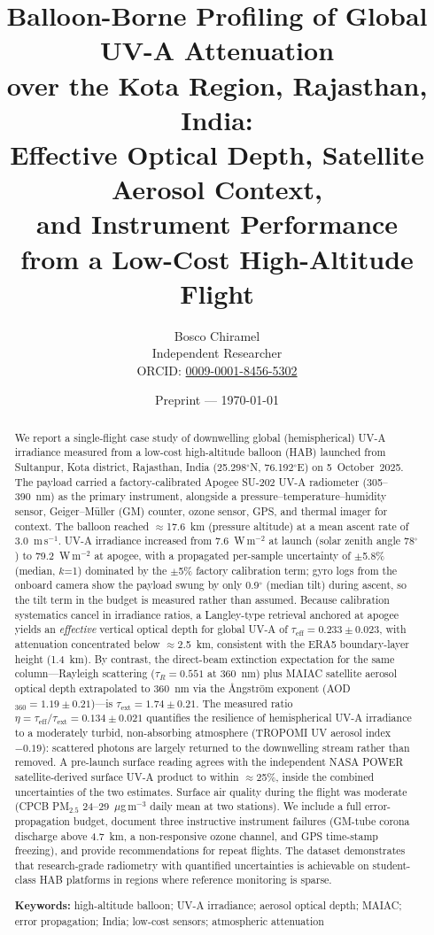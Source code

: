 \documentclass[11pt,a4paper]{article}
\title{\textbf{Balloon-Borne Profiling of Global UV-A Attenuation\\
over the Kota Region, Rajasthan, India:\\
Effective Optical Depth, Satellite Aerosol Context,\\
and Instrument Performance\\
from a Low-Cost High-Altitude Flight}}
\author{Bosco Chiramel\\
\small Independent Researcher\\
\small ORCID: \href{https://orcid.org/0009-0001-8456-5302}{0009-0001-8456-5302}}
\date{Preprint --- \today}
\begin{document}
\maketitle

\begin{abstract}
\noindent
We report a single-flight case study of downwelling global (hemispherical) UV-A irradiance
measured from a low-cost high-altitude balloon (HAB) launched from Sultanpur, Kota
district, Rajasthan, India (25.298$^\circ$N, 76.192$^\circ$E) on 5~October~2025. The payload carried a factory-calibrated
Apogee SU-202 UV-A radiometer (305--390~nm) as the primary instrument, alongside a
pressure--temperature--humidity sensor, Geiger--M\"uller (GM) counter, ozone sensor, GPS, and
thermal imager for context. The balloon reached $\approx$17.6~km (pressure altitude) at a
mean ascent rate of 3.0~m\,s$^{-1}$. UV-A irradiance increased from 7.6~W\,m$^{-2}$ at launch (solar zenith angle
78$^\circ$) to 79.2~W\,m$^{-2}$ at apogee, with a propagated per-sample uncertainty of
$\pm$5.8\% (median, $k$=1) dominated by the $\pm$5\% factory calibration term; gyro logs
from the onboard camera show the payload swung by only 0.9$^\circ$ (median tilt) during
ascent, so the tilt term in the budget is measured rather than assumed. Because
calibration systematics cancel in irradiance ratios, a Langley-type retrieval anchored at
apogee yields an \emph{effective} vertical optical depth for global UV-A of
$\tau_{\mathrm{eff}} = 0.233 \pm 0.023$, with attenuation concentrated below
$\approx$2.5~km, consistent with the ERA5 boundary-layer height (1.4~km). By contrast, the
direct-beam extinction expectation for the same column---Rayleigh scattering
($\tau_R = 0.551$ at 360~nm) plus MAIAC satellite aerosol optical depth extrapolated to
360~nm via the \r{A}ngstr\"om exponent (AOD$_{360} = 1.19 \pm 0.21$)---is
$\tau_{\mathrm{ext}} = 1.74 \pm 0.21$. The measured ratio
$\eta = \tau_{\mathrm{eff}}/\tau_{\mathrm{ext}} = 0.134 \pm 0.021$ quantifies the
resilience of hemispherical UV-A irradiance to a moderately turbid, non-absorbing
atmosphere (TROPOMI UV aerosol index $-0.19$): scattered photons are largely returned to
the downwelling stream rather than removed. A pre-launch surface reading agrees with the
independent NASA POWER satellite-derived surface UV-A product to within $\approx$25\%,
inside the combined uncertainties of the two estimates. Surface air quality during the
flight was moderate (CPCB PM$_{2.5}$ 24--29~$\mu$g\,m$^{-3}$ daily mean at two stations). We include a
full error-propagation budget, document three instructive instrument failures (GM-tube
corona discharge above 4.7~km, a non-responsive ozone channel, and GPS time-stamp freezing),
and provide recommendations for repeat flights. The dataset demonstrates that
research-grade radiometry with quantified uncertainties is achievable on student-class HAB
platforms in regions where reference monitoring is sparse.
\medskip

\noindent\textbf{Keywords:} high-altitude balloon; UV-A irradiance; aerosol optical depth;
MAIAC; error propagation; India; low-cost sensors; atmospheric attenuation
\end{abstract}
\end{document}
